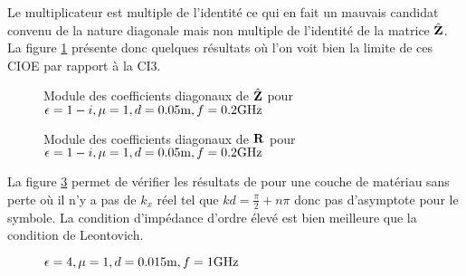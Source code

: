       Le multiplicateur est multiple de l'identité ce qui en fait un mauvais candidat convenu de la nature diagonale mais non multiple de l’identité de la matrice \(\hat{\mathbf{Z}}\). La figure \ref{fig:imp_fourier:plan:stupfel:hoibc} présente donc quelques résultats où l'on voit bien la limite de ces CIOE par rapport à la CI3.
      \begin{figure}[!hbt]
        \centering
        
        \caption[CIOE sur empilement de B.~Stupfel p.~1661]{Module des coefficients diagonaux de \(\hat{\mathbf{Z}}\) pour \(\epsilon = 1-i, \mu = 1, d=0.05\text{m}, f=0.2\text{GHz}\)}
        \label{fig:imp_fourier:plan:stupfel:hoibc}
      \end{figure}
      \begin{table}[!hbt]
        \centering

        \caption{Coefficients associés à la figure \ref{fig:imp_fourier:plan:stupfel:hoibc}}
        \label{tab:imp_fourier:plan:stupfel:hoibc}
      \end{table}
      
      \begin{figure}[!hbt]
        \centering
        
        \caption[CIOE sur empilement de B.~Stupfel p.~1661]{Module des coefficients diagonaux de \(\mathbf{R}\) pour \(\epsilon = 1-i, \mu = 1, d=0.05\text{m}, f=0.2\text{GHz}\)}
        \label{fig:reflex_fourier:plan:stupfel:hoibc}
      \end{figure}

      La figure \ref{fig:imp_fourier:plan:hoppe:33:hoibc} permet de vérifier les résultats de \cite[p.~33]{hoppe_impedance_1995} pour une couche de matériau sans perte où il n'y a pas de \(k_x\) réel tel que \(kd=\frac{\pi}{2} + n \pi\) donc pas d'asymptote pour le symbole. La condition d'impédance d'ordre élevé est bien meilleure que la condition de Leontovich.
      \begin{figure}[!hbt]
          \centering
          
          \caption[CIOE sur empilement de Hoppe & Rahmat-Samii p.~33]{\(\epsilon = 4, \mu = 1, d=0.015\text{m}, f=1\text{GHz}\)}
          \label{fig:imp_fourier:plan:hoppe:33:hoibc}
      \end{figure}
      \begin{table}[!hbt]
        \centering
        \caption{Coefficients associés à la figure \ref{fig:imp_fourier:plan:hoppe:33:hoibc}}
        \label{tab:imp_fourier:plan:hoppe:33:hoibc}
      \end{table}

